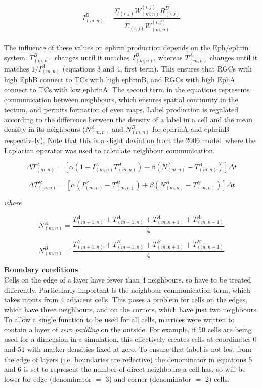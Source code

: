 \documentclass[11pt]{"article"}
\begin{document}
\begin{equation}
I_{(m,n)}^B = \frac{\Sigma_{(i,j)} W^{(i,j)}_{(m,n)} R_{(i,j)}^B}{\Sigma_{(i,j)} W^{(i,j)}_{(m,n)}}
\end{equation}\\

The influence of these values on ephrin production depends on the Eph/ephrin system. $T_{(m,n)}^B$ changes until it matches $I_{(m,n)}^B$, whereas $T_{(m,n)}^A$ changes until it matches $1 / I_{(m,n)}^A$ (equations 3 and 4, first term). This ensures that RGCs with high EphB connect to TCs with high ephrinB, and RGCs with high EphA connect to TCs with low ephrinA.  The second term in the equations represents communication between neighbours, which ensures spatial continuity in the tectum, and permits formation of even maps. Label production is regulated according to the difference between the density of a label in a cell and the mean density in its neighbours ($N_{(m,n)}^A$ and $N_{(m,n)}^B$ for ephrinA and ephrinB respectively). Note that this is a slight deviation from the 2006 model, where the Laplacian operator was used to calculate neighbour communication.

\begin{equation}
\Delta T_{(m,n)}^A = [\alpha (1 - I_{(m,n)}^A T_{(m,n)}^A) + \beta (N_{(m,n)}^A - T_{(m,n)}^A)] \Delta t
\end{equation}

\begin{equation}
\Delta T_{(m,n)}^B = [\alpha (I_{(m,n)}^B - T_{(m,n)}^B) + \beta (N_{(m,n)}^B - T_{(m,n)}^B)] \Delta t
\end{equation}

\textit{where}

\begin{equation}
N_{(m,n)}^A = \frac{T_{(m+1,n)}^A + T_{(m-1,n)}^A + T_{(m,n+1)}^A + T_{(m,n-1)}^A}{4}
\end{equation}

\begin{equation}
N_{(m,n)}^B = \frac{T_{(m+1,n)}^B + T_{(m-1,n)}^B + T_{(m,n+1)}^B + T_{(m,n-1)}^B}{4}
\end{equation}

\textbf{Boundary conditions}\\
Cells on the edge of a layer have fewer than 4 neighbours, so have to be treated differently. Particularly important is the neighbour communication term, which takes inputs from 4 adjacent cells. This poses a problem for cells on the edges, which have three neighbours, and on the corners, which have just two neighbours. To allow a single function to be used for all cells, matrices were written to contain a layer of \textit{zero padding} on the outside. For example, if 50 cells are being used for a dimension in a simulation, this effectively creates cells at coordinates 0 and 51 with marker densities fixed at zero. To ensure that label is not lost from the edge of layers (i.e. boundaries are reflective) the denominator in equations 5 and 6 is set to represent the number of direct neighbours a cell has, so will be lower for edge (denominator $=$ 3) and corner (denominator $=$ 2) cells. 
\\
\end{document}
